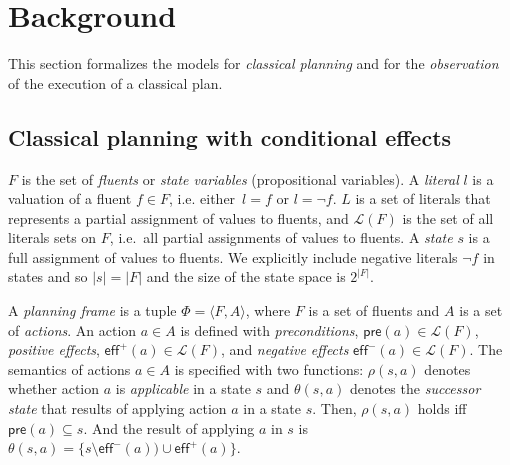 \documentclass[letterpaper]{article} %
\newcommand{\tup}[1]{{\langle #1 \rangle}}
\newcommand{\pre}{\mathsf{pre}}     %
\newcommand{\eff}{\mathsf{eff}}     %
\begin{document}
\section{Background}
\label{sec:background}
This section formalizes the models for {\em classical planning} and for the {\em observation} of the execution of a classical plan.

\subsection{Classical planning with conditional effects}
$F$ is the set of {\em fluents} or {\em state variables} (propositional variables). A {\em literal} $l$ is a valuation of a fluent $f\in F$, i.e. either~$l=f$ or $l=\neg f$. $L$ is a set of literals that represents a partial assignment of values to fluents, and $\mathcal{L}(F)$ is the set of all literals sets on $F$, i.e.~all partial assignments of values to fluents. A {\em state} $s$ is a full assignment of values to fluents. We explicitly include negative literals $\neg f$ in states and so $|s|=|F|$ and the size of the state space is $2^{|F|}$.


A {\em planning frame} is a tuple $\Phi=\tup{F,A}$, where $F$ is a set of fluents and $A$ is a set of \emph{actions}. An action $a\in A$ is defined with {\em preconditions}, $\pre(a)\in\mathcal{L}(F)$, {\em positive effects}, $\eff^+(a)\in\mathcal{L}(F)$, and {\em negative effects} $\eff^-(a)\in\mathcal{L}(F)$. The semantics of actions $a\in A$ is specified with two functions: $\rho(s,a)$ denotes whether action $a$ is {\em applicable} in a state $s$ and $\theta(s,a)$ denotes the {\em successor state} that results of applying action $a$ in a state $s$. Then, $\rho(s,a)$ holds iff $\pre(a)\subseteq s$. And the result of applying $a$ in $s$ is $\theta(s,a)=\{s\setminus\eff^-(a))\cup\eff^+(a)\}$.
\end{document}
